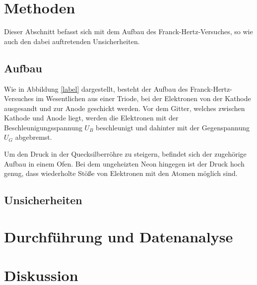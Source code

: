 \section{Methoden}
	
	Dieser Abschnitt befasst sich mit dem Aufbau des Franck-Hertz-Versuches, so wie auch den dabei auftretenden Unsicherheiten.
	
	\subsection{Aufbau}
		
		Wie in Abbildung \ref{label} dargestellt, besteht der Aufbau des Franck-Hertz-Versuches im Wesentlichen aus einer Triode, bei der Elektronen von der Kathode ausgesandt und zur Anode geschickt werden.		
		Vor dem Gitter, welches zwischen Kathode und Anode liegt, werden die Elektronen mit der Beschleunigungsspannung	$U_B$ beschleunigt und dahinter mit der Gegenspannung $U_G$ abgebremst.
		
		Um den Druck in der Quecksilberröhre zu steigern, befindet sich der zugehörige Aufbau in einem Ofen.
		Bei dem ungeheizten Neon hingegen ist der Druck hoch genug, dass wiederholte Stöße von Elektronen mit den Atomen möglich sind.
		

	\subsection{Unsicherheiten} 


\section{Durchführung und Datenanalyse}


\section{Diskussion}

